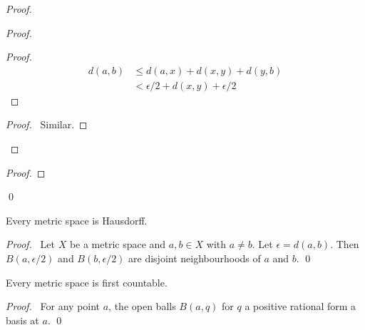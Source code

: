 \begin{proof}
  \pf
  \begin{proof}
    \begin{proof}
      \pf
      \begin{align*}
        d(a,b) & \leq d(a,x) + d(x,y) + d(y,b) \\
        & < \epsilon / 2 + d(x,y) + \epsilon / 2
      \end{align*}
    \end{proof}
    \begin{proof}
      \pf\ Similar.
    \end{proof}
  \end{proof}
  \begin{proof}
  \end{proof}
  \qed
\end{proof}

\begin{prop}
  Every metric space is Hausdorff.
\end{prop}

\begin{proof}
  \pf\ Let $X$ be a metric space and $a, b \in X$ with $a \neq b$. Let $\epsilon = d(a, b)$. Then $B(a, \epsilon / 2)$ and $B(b, \epsilon / 2)$ are disjoint neighbourhoods of $a$ and $b$. \qed
\end{proof}

\begin{prop}
  Every metric space is first countable.
\end{prop}

\begin{proof}
  \pf\ For any point $a$, the open balls $B(a, q)$ for $q$ a positive rational form a basis at $a$. \qed
\end{proof}


